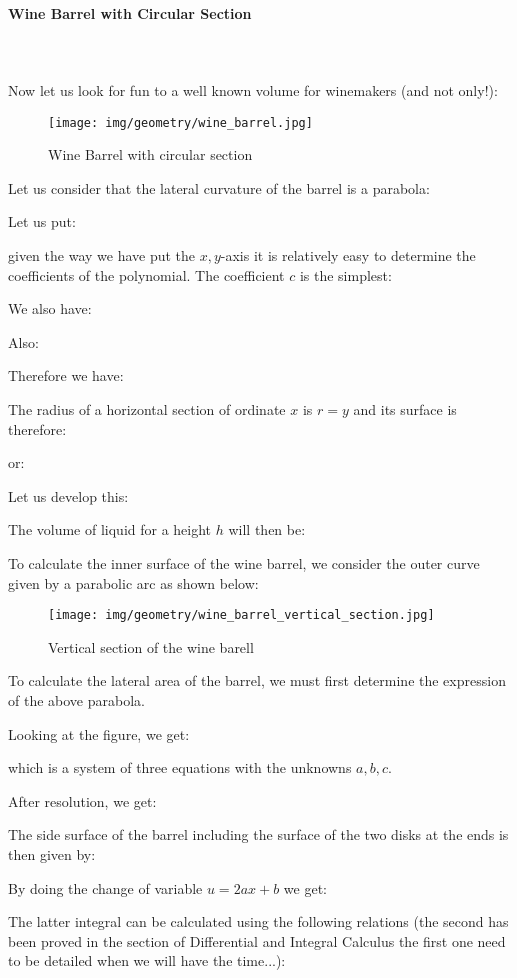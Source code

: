 {	\paragraph{Wine Barrel with Circular Section}\mbox{}\\\\
	Now let us look for fun to a well known volume for winemakers (and not only!):
	\begin{figure}[H]
		\centering
		\texttt{[image: img/geometry/wine\_barrel.jpg]}
		\caption[]{Wine Barrel with circular section}
	\end{figure}
	Let us consider that the lateral curvature of the barrel is a parabola:
	
	Let us put:
	
	given the way we have put the $x, y$-axis it is relatively easy to determine the coefficients of the polynomial. The coefficient $c$ is the simplest:
	
	We also have:
	
	Also:
	
	Therefore we have:
	
	The radius of a horizontal section of ordinate $x$ is $r=y$ and its surface is therefore:
	
	or:
	
	Let us develop this:
	
	The volume of liquid for a height $h$ will then be:
	
	To calculate the inner surface of the wine barrel, we consider the outer curve given by a parabolic arc as shown below:
	\begin{figure}[H]
		\centering
		\texttt{[image: img/geometry/wine\_barrel\_vertical\_section.jpg]}
		\caption[]{Vertical section of the wine barell}
	\end{figure}
	To calculate the lateral area of the barrel, we must first determine the expression of the above parabola.
	
	Looking at the figure, we get:
	
	which is a system of three equations with the unknowns $a,b,c$.
	
	After resolution, we get:
	
	The side surface of the barrel including the surface of the two disks at the ends is then given by:
	
	By doing the change of variable $u=2ax+b$ we get:
	
	The latter integral can be calculated using the following relations (the second has been proved in the section of Differential and Integral Calculus the first one need to be detailed when we will have the time...):
	
}
